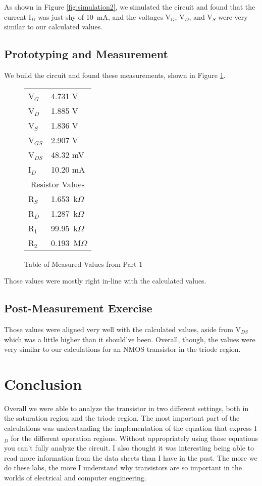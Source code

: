 \documentclass{article}
\begin{document}
As shown in Figure \ref{fig:simulation2}, we simulated the circuit
and found that the current I$_D$ was just shy of 10~mA, and the
voltages V$_{G}$, V$_{D}$, and V$_S$ were very similar to our
calculated values.


\subsection{Prototyping and Measurement}

We build the circuit and found these measurements, shown
in Figure \ref{fig:tablevalues2}.

\begin{figure}[!h]
\begin{center}
\begin{tabular}{ l|l }
  V$_G$ & 4.731 V  \\
  V$_D$ & 1.885 V    \\
  V$_S$ & 1.836 V     \\
  V$_{GS}$ & 2.907 V   \\
  V$_{DS}$ & 48.32 mV  \\
  I$_D$ & 10.20 mA \\
  \multicolumn{2}{c}{Resistor Values} \\
  R$_S$ & 1.653~k$\Omega$ \\
  R$_D$ & 1.287~k$\Omega$   \\
  R$_1$ & 99.95~k$\Omega$  \\
  R$_2$ & 0.193~M$\Omega$
\end{tabular}
\caption{Table of Measured Values from Part 1}
\label{fig:tablevalues2}
\end{center}
\end{figure}

Those values were mostly right in-line with the calculated
values.

\subsection{Post-Measurement Exercise}

Those values were aligned very well with the calculated values,
aside from V$_{DS}$ which was a little higher than it should've
been. Overall, though, the values were very similar to
our calculations for an NMOS transistor in the triode region.

\section{Conclusion}

Overall we were able to analyze the transistor in two different
settings, both in the saturation region and the triode region.
The most important part of the calculations was understanding the
implementation of the equation that express I$_D$ for the
different operation regions. Without appropriately using those
equations you can't fully analyze the circuit. I also thought
it was interesting being able to read more information from 
the data sheets than I have in the past. The more we do these
labs, the more I understand why transistors are so important
in the worlds of electrical and computer engineering.
\end{document}
